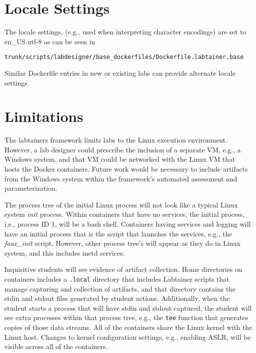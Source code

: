 \documentclass[12pt]{article}
\begin{document}
\section{Locale Settings}
The locale settings, (e.g., used when interpreting character encodings) are set to en\_US.utf-8 
as can be seen in 
\begin{verbatim}
trunk/scripts/labdesigner/base_dockerfiles/Dockerfile.labtainer.base
\end{verbatim}
Similar Dockerfile entries in new or existing labs can provide alternate locale settings.

\section{Limitations}
The labtainers framework limits labs to the Linux execution environment.
However, a lab designer could prescribe the inclusion of a separate
VM, e.g., a Windows system, and that VM could be networked with the Linux
VM that hosts the Docker containers.  Future work would be necessary to include
artifacts from the Windows system within the framework's automated assessment
and parameterization.

The process tree of the initial Linux process will
not look like a typical Linux system \textit{init} process.  Within containers that have no
services, the initial process, i.e., process ID 1, will be a bash shell.
Containers having services and logging will have an initial process that is
the script that launches the services, e.g., the \textit{faux\_init} script.  However,
other process tree's will appear as they
do in Linux system, and this includes inetd services.

Inquisitive students will see evidence of artifact collection.  Home directories
on containers includes a \texttt{.local} directory that includes Labtainer scripts that manage
capturing and collection of artifacts, and that directory contains the stdin and
stdout files generated by student actions. Additionally, when the student starts a process
that will have stdin and stdout captured, the student will see extra processes within
that process tree, e.g., the \texttt{tee} function that generates copies of those data streams.
All of the containers share the Linux kernel with the Linux host.  Changes to
kernel configuration settings, e.g., enabling ASLR, will be visible across all
of the containers.
\end{document}
